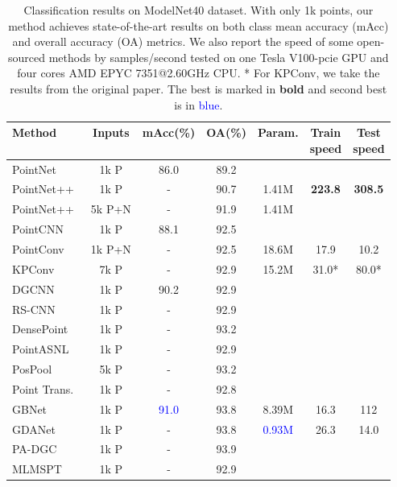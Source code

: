 \begin{table}[]
\small
    \centering
    \caption{Classification results on ModelNet40 dataset. 
 With only 1k points, our method achieves state-of-the-art results on both class mean accuracy (mAcc) and overall accuracy (OA) metrics. We also report the speed of some open-sourced methods by samples/second tested on one Tesla V100-pcie GPU and four cores AMD EPYC 7351@2.60GHz CPU. * For KPConv, we take the results from the original paper. The best is marked in \textbf{bold} and second best is in \textcolor{blue}{blue}.}
 \vspace{1mm}
    \begin{tabular}{l|ccc|ccc}
    \toprule
         Method& Inputs & mAcc(\%) &OA(\%) & Param. &\makecell{ Train\\speed} &\makecell{ Test\\speed} \\
         \midrule
         PointNet~\citep{qi2017pointnet}   & 1k P &86.0 &89.2 & & & \\
         PointNet++~\citep{qi2017pointnet++} & 1k P &-&90.7  & 1.41M&\textbf{223.8} &\textbf{308.5} \\
         PointNet++~\citep{qi2017pointnet++} &5k P+N &-&91.9  & 1.41M& & \\
         \midrule
         PointCNN~\citep{li2018pointcnn}   &1k P &88.1&92.5  & & & \\
         
         PointConv~\citep{wu2019pointconv}  &1k P+N &-&92.5  &18.6M &17.9 &10.2 \\
         KPConv~\citep{thomas2019kpconv}     & 7k P &-&92.9  &15.2M &31.0* &80.0* \\
         DGCNN~\citep{wang2019dynamic}      & 1k P &90.2&92.9  & & &  \\
         RS-CNN~\citep{liu2019relation}     & 1k P &-&92.9  & & & \\
         DensePoint~\citep{liu2019densepoint} &1k P &-&93.2  & & & \\
         PointASNL~\citep{yan2020pointasnl}  & 1k P &-&92.9  & & & \\
         PosPool~\citep{liu2020closer}    &5k P &-&93.2  & & & \\
         Point Trans.~\citep{engel2020point}  &1k P &-&92.8  & & & \\
         GBNet~\citep{qiu2021geometric} &1k P &\textcolor{blue}{91.0} &93.8 &8.39M &16.3 &112 \\
         GDANet~\citep{xu2021learning}& 1k P &-&93.8  &\textcolor{blue}{0.93M} &26.3 & 14.0\\
         PA-DGC~\citep{xu2021paconv}    &1k P &-&93.9  & & & \\
         MLMSPT~\citep{han2021point}  &1k P &-&92.9  & & & \\
         

\end{tabular}
\end{table}
